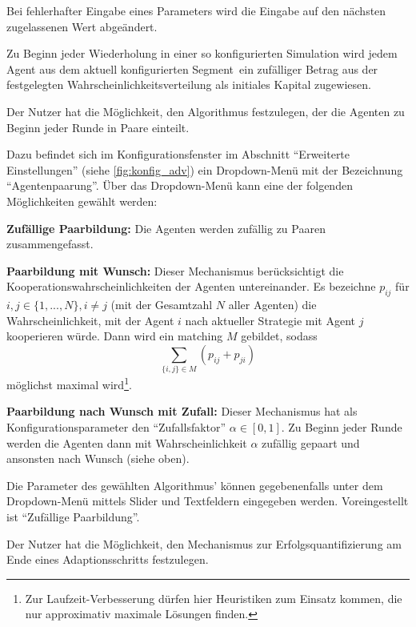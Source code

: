 \documentclass[parskip=full,11pt]{scrartcl}
\def\adapt{Adaptionsschritt}
\def\segment{Segment}
\begin{document}
Bei fehlerhafter Eingabe eines Parameters wird die Eingabe auf den nächsten zugelassenen Wert abgeändert.

Zu Beginn jeder Wiederholung in einer so konfigurierten Simulation wird jedem Agent aus dem aktuell konfigurierten \segment\ ein zufälliger Betrag aus der festgelegten Wahrscheinlichkeitsverteilung als initiales \Gls{Kapital} zugewiesen.


Der \Gls{Nutzer} hat die Möglichkeit, den Algorithmus festzulegen, der die Agenten zu Beginn jeder Runde in Paare einteilt.

Dazu befindet sich im Konfigurationsfenster im Abschnitt \enquote{Erweiterte Einstellungen} (siehe \cref{fig:konfig_adv}) ein Dropdown-Menü mit der Bezeichnung \enquote{Agentenpaarung}. Über das Dropdown-Menü kann eine der folgenden Möglichkeiten gewählt werden:

\textbf{Zufällige Paarbildung:}
Die Agenten werden zufällig zu Paaren zusammengefasst.

\textbf{Paarbildung mit Wunsch:}
Dieser Mechanismus berücksichtigt die Kooperationswahrscheinlichkeiten der Agenten untereinander. Es bezeichne \(p_{ij}\) für \(i,j \in \{1,...,N\}, i \neq j\) (mit der Gesamtzahl \(N\) aller Agenten) die Wahrscheinlichkeit, mit der Agent \(i\) nach aktueller \Gls{Strategie} mit Agent \(j\) kooperieren würde. Dann wird ein \Gls{matching} \(M\) gebildet, sodass
\[
\sum_{\{i,j\} \in M} \left(p_{ij} + p_{ji}\right)
\]
möglichst maximal wird\footnote{Zur Laufzeit-Verbesserung dürfen hier Heuristiken zum Einsatz kommen, die nur approximativ maximale Lösungen finden.}.

\textbf{Paarbildung nach Wunsch mit Zufall:}
Dieser Mechanismus hat als Konfigurationsparameter den \enquote{Zufallsfaktor} \(\alpha \in [0,1]\). Zu Beginn jeder Runde werden die Agenten dann mit Wahrscheinlichkeit \(\alpha\) zufällig gepaart und ansonsten nach Wunsch (siehe oben).

Die Parameter des gewählten Algorithmus' können gegebenenfalls unter dem Dropdown-Menü mittels Slider und Textfeldern eingegeben werden. Voreingestellt ist \enquote{Zufällige Paarbildung}.

Der \Gls{Nutzer} hat die Möglichkeit, den Mechanismus zur Erfolgsquantifizierung am Ende eines \adapt s festzulegen.
\end{document}
